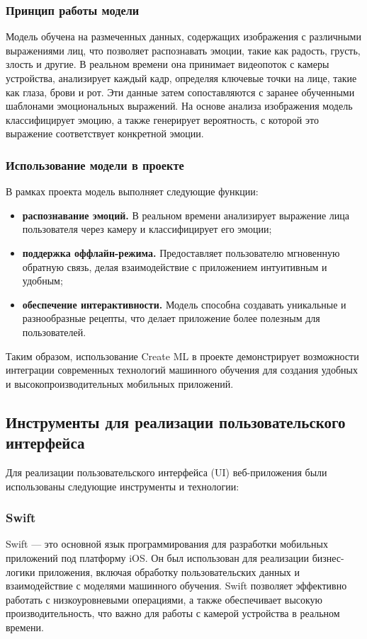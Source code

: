 {{\subsubsection*{Принцип работы модели}

Модель обучена на размеченных данных, содержащих изображения с различными выражениями лиц, что позволяет распознавать эмоции, такие как радость, грусть, злость и другие. В реальном времени она принимает видеопоток с камеры устройства, анализирует каждый кадр, определяя ключевые точки на лице, такие как глаза, брови и рот. Эти данные затем сопоставляются с заранее обученными шаблонами эмоциональных выражений. На основе анализа изображения модель классифицирует эмоцию, а также генерирует вероятность, с которой это выражение соответствует конкретной эмоции.

\subsubsection*{Использование модели в проекте}
В рамках проекта модель выполняет следующие функции:
\begin{itemize}
    \item \textbf{распознавание эмоций.} В реальном времени анализирует выражение лица пользователя через камеру и классифицирует его эмоции;
    \item \textbf{поддержка оффлайн-режима.} Предоставляет пользователю мгновенную обратную связь, делая взаимодействие с приложением интуитивным и удобным;
    \item \textbf{обеспечение интерактивности.} Модель способна создавать уникальные и разнообразные рецепты, что делает приложение более полезным для пользователей.
\end{itemize}

Таким образом, использование Create ML в проекте демонстрирует возможности интеграции современных технологий машинного обучения для создания удобных и высокопроизводительных мобильных приложений.
}
\subsection{Инструменты для реализации пользовательского интерфейса}
Для реализации пользовательского интерфейса (UI) веб-приложения были использованы следующие инструменты и технологии:

\subsubsection*{Swift}
Swift — это основной язык программирования для разработки мобильных приложений под платформу iOS. Он был использован для реализации бизнес-логики приложения, включая обработку пользовательских данных и взаимодействие с моделями машинного обучения. Swift позволяет эффективно работать с низкоуровневыми операциями, а также обеспечивает высокую производительность, что важно для работы с камерой устройства в реальном времени.

}
